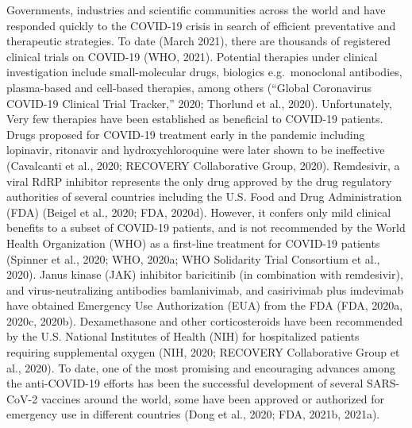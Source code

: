 \documentclass[12pt,twoside,openany,\mydriver]{thesis}  %
\begin{document}
Governments, industries and scientific communities across the world and have responded quickly to the COVID-19 crisis in search of efficient preventative and therapeutic strategies. To date (March 2021), there are thousands of registered clinical trials on COVID-19 (WHO, 2021). Potential therapies under clinical investigation include small-molecular drugs, biologics e.g.~monoclonal antibodies, plasma-based and cell-based therapies, among others (``Global Coronavirus COVID-19 Clinical Trial Tracker,'' 2020; Thorlund et al., 2020). Unfortunately, Very few therapies have been established as beneficial to COVID-19 patients. Drugs proposed for COVID-19 treatment early in the pandemic including lopinavir, ritonavir and hydroxychloroquine were later shown to be ineffective (Cavalcanti et al., 2020; RECOVERY Collaborative Group, 2020). Remdesivir, a viral RdRP inhibitor represents the only drug approved by the drug regulatory authorities of several countries including the U.S. Food and Drug Administration (FDA) (Beigel et al., 2020; FDA, 2020d). However, it confers only mild clinical benefits to a subset of COVID-19 patients, and is not recommended by the World Health Organization (WHO) as a first-line treatment for COVID-19 patients (Spinner et al., 2020; WHO, 2020a; WHO Solidarity Trial Consortium et al., 2020). Janus kinase (JAK) inhibitor baricitinib (in combination with remdesivir), and virus-neutralizing antibodies bamlanivimab, and casirivimab plus imdevimab have obtained Emergency Use Authorization (EUA) from the FDA (FDA, 2020a, 2020c, 2020b). Dexamethasone and other corticosteroids have been recommended by the U.S. National Institutes of Health (NIH) for hospitalized patients requiring supplemental oxygen (NIH, 2020; RECOVERY Collaborative Group et al., 2020). To date, one of the most promising and encouraging advances among the anti-COVID-19 efforts has been the successful development of several SARS-CoV-2 vaccines around the world, some have been approved or authorized for emergency use in different countries (Dong et al., 2020; FDA, 2021b, 2021a).
\end{document}
